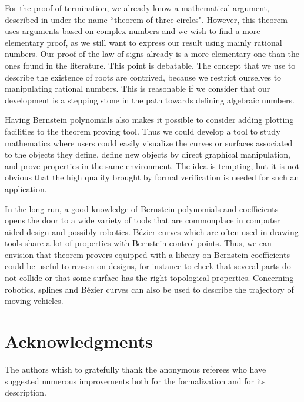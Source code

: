 \documentclass{mscs}
\begin{document}
For the proof of termination, we already know a mathematical argument,
described in \cite{bpr} under the name ``theorem of three
circles". However, this theorem uses arguments based on complex
numbers and we wish to find a more elementary proof, as we still want
to express our result using mainly rational numbers.  Our proof of the
law of signs already is a more elementary one than the ones found in
the literature. This point is debatable. The concept that we use to
describe the existence of roots are contrived, because we restrict
ourselves to manipulating rational numbers. This is reasonable if we
consider that our development is a stepping stone in the path towards
defining algebraic numbers.

Having Bernstein polynomials also makes it possible to consider adding
plotting facilities to the theorem proving tool. Thus we could develop
a tool to study mathematics where users could easily visualize the
curves or surfaces associated to the objects they define, define new
objects by direct graphical manipulation, and prove properties in the
same environment. The idea is tempting, but it is not obvious that the
high quality brought by formal verification is needed for such an
application.

In the long run, a good knowledge of Bernstein polynomials and
coefficients opens the door to a wide variety of tools that are
commonplace in computer aided design and possibly robotics. B\'ezier
curves which are often used in drawing tools share a lot of
properties with Bernstein control points. Thus, we can envision that
theorem provers equipped with a library on Bernstein coefficients
could be useful to reason on designs, for instance to check that
several parts do not collide or that some surface has the right
topological properties. Concerning robotics, splines and B\'ezier curves
can also be used to describe the trajectory of moving vehicles.

\section{Acknowledgments} The authors whish to gratefully thank the
anonymous referees who have suggested numerous improvements both for
the formalization and for its description.



\end{document}

